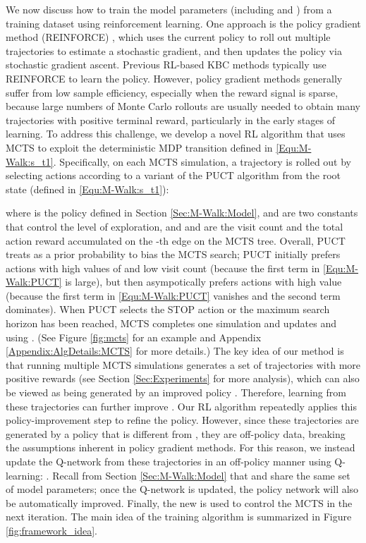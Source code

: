 \documentclass{article}
\newcommand{\modelname}{M-Walk}
\begin{document}
	
	We now discuss how to train the model parameters  (including  and ) from a training dataset  using reinforcement learning. One approach is the policy gradient method (REINFORCE) \cite{williams1992simple,sutton2000policy}, which uses the current policy  to roll out multiple trajectories  to estimate a stochastic gradient, and then updates the policy  via stochastic gradient ascent. Previous RL-based KBC methods \cite{DeepPath,GoforaWalk} typically use REINFORCE to learn the policy. However, policy gradient methods generally suffer from low sample efficiency, especially when the reward signal is sparse, because large numbers of Monte Carlo rollouts are usually needed to obtain many trajectories with positive terminal reward, particularly in the early stages of learning. To address this challenge, we develop a novel RL algorithm that uses MCTS to exploit the deterministic MDP transition defined in \eqref{Equ:\modelname:s_t1}. Specifically, on each MCTS simulation, a trajectory is rolled out by selecting actions according to a variant of the PUCT algorithm \cite{Rosin2011, silver2017mastering} from the root state  (defined in \eqref{Equ:\modelname:s_t1}):

	where  is the policy defined in Section \ref{Sec:\modelname:Model},  and  are two constants that control the level of exploration, and  and  are the visit count and the total action reward accumulated on the -th edge on the MCTS tree. Overall, PUCT treats  as a prior probability to bias the MCTS search; PUCT initially prefers actions with high values of  and low visit count  (because the first term in \eqref{Equ:\modelname:PUCT} is large), but then asympotically prefers actions with high value (because the first term in \eqref{Equ:\modelname:PUCT} vanishes and the second term  dominates). When PUCT selects the STOP action or the maximum search horizon has been reached, MCTS completes one simulation and updates  and  using . (See Figure \ref{fig:mcts} for an example and Appendix \ref{Appendix:AlgDetails:MCTS} for more details.) The key idea of our method is that running multiple MCTS simulations generates a set of trajectories with more positive rewards (see Section \ref{Sec:Experiments} for more analysis), which can also be viewed as being generated by an improved policy . Therefore, learning from these trajectories can further improve . Our RL algorithm repeatedly applies this policy-improvement step to refine the policy. However, since these trajectories are generated by a policy that is different from , they are off-policy data, breaking the assumptions inherent in policy gradient methods. For this reason, we instead update the Q-network from these trajectories in an off-policy manner using Q-learning: . Recall from Section \ref{Sec:\modelname:Model} that  and  share the same set of model parameters; once the Q-network is updated, the policy network  will also be automatically improved. Finally, the new  is used to control the MCTS in the next iteration. The main idea of the training algorithm is summarized in Figure \ref{fig:framework_idea}.
	
\end{document}
